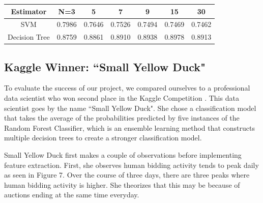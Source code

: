 \documentclass{article} %
\begin{document}
\begin{tabular}
{c|cccccc}
Estimator & N=3 & 5 & 7 & 9 & 15 & 30\\
\hline
SVM & 0.7986 & 0.7646 & 0.7526 & 0.7494 & 0.7469 & 0.7462\\
Decision Tree & 0.8759 & 0.8861 & 0.8910 & 0.8938 & 0.8978 & 0.8913
\end{tabular}

\subsection{Kaggle Winner: ``Small Yellow Duck"}

To evaluate the success of our project, we compared ourselves to a professional data scientist who won second place in the Kaggle Competition \cite{SYD}.
This data scientist goes by the name ``Small Yellow Duck".
She chose a classification model that takes the average of the probabilities predicted by five instances of the Random Forest Classifier, which is an ensemble learning method that constructs multiple decision trees to create a stronger classification model.

Small Yellow Duck first makes a couple of observations before implementing feature extraction.
First, she observes human bidding activity tends to peak daily as seen in Figure 7. %
Over the course of three days, there are three peaks where human bidding activity is higher.
She theorizes that this may be because of auctions ending at the same time everyday.


\begin{figure}[h]
\centering
{}
\end{figure}
\end{document}
